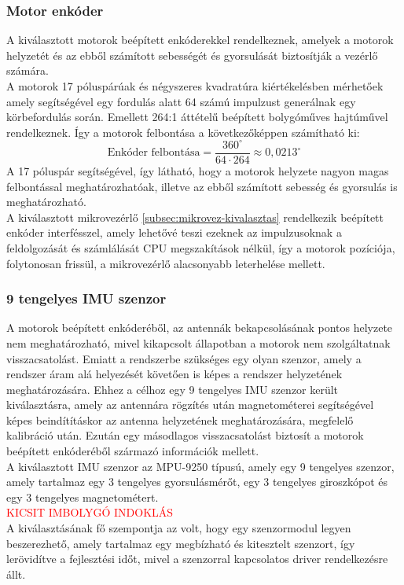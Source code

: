 \subsubsection{Motor enkóder}

A kiválasztott motorok \cite{nfp36gp555} beépített enkóderekkel rendelkeznek, amelyek
a motorok helyzetét és az ebből számított sebességét és gyorsulását biztosítják a vezérlő számára. \\
A motorok 17 póluspárúak és négyszeres kvadratúra kiértékelésben mérhetőek amely segítségével egy fordulás alatt 64 számú impulzust generálnak egy körbefordulás során.
Emellett  264:1 áttételű beépített bolygóműves hajtúművel rendelkeznek.
Így a motorok felbontása a következőképpen számítható ki:
\begin{equation}
    \text{Enkóder felbontása} = \dfrac{360^\circ}{64 \cdot 264} \approx 0,0213^\circ
\end{equation}
A 17 póluspár segítségével, így látható, hogy a motorok helyzete nagyon magas felbontással meghatározhatóak, 
illetve az ebből számított sebesség és gyorsulás is meghatározható. \\
A kiválasztott mikrovezérlő \ref{subsec:mikrovez-kivalasztas} rendelkezik beépített enkóder interfésszel, amely lehetővé teszi ezeknek az impulzusoknak a feldolgozását
és számlálását CPU megszakítások nélkül, így a motorok pozíciója, folytonosan frissül, a mikrovezérlő alacsonyabb leterhelése mellett. \\

\subsubsection{9 tengelyes IMU szenzor}

A motorok beépített enkóderéből, az antennák bekapcsolásának pontos helyzete nem meghatározható, 
mivel kikapcsolt állapotban a motorok nem szolgáltatnak visszacsatolást. 
Emiatt a rendszerbe szükséges egy olyan szenzor, amely a rendszer áram alá helyezését követően is képes a 
rendszer helyzetének meghatározására.
Ehhez a célhoz egy 9 tengelyes IMU szenzor került kiválasztásra, amely az antennára rögzítés után magnetométerei segítségével képes beindítításkor
az antenna helyzetének meghatározására, megfelelő kalibráció után. Ezután egy másodlagos visszacsatolást biztosít a motorok beépített enkóderéből származó információk mellett. \\
A kiválasztott IMU szenzor az MPU-9250 \cite{mpu9250} típusú, amely egy 9 tengelyes szenzor, amely tartalmaz egy 3 tengelyes gyorsulásmérőt, egy 3 tengelyes giroszkópot és egy 3 tengelyes magnetométert. \\
\textcolor{red}{KICSIT IMBOLYGÓ INDOKLÁS}
\vspace{0.2cm} \\
A kiválasztásának fő szempontja az volt, hogy egy szenzormodul legyen beszerezhető, amely tartalmaz egy megbízható és kitesztelt szenzort,
így lerövidítve a fejlesztési időt, mivel a szenzorral kapcsolatos driver rendelkezésre állt. \\


